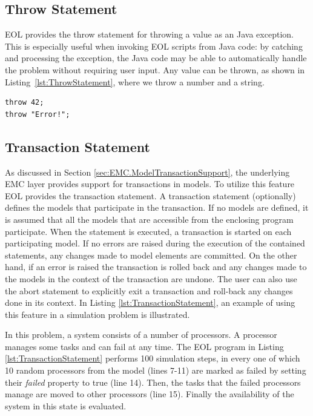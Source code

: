 \subsection{Throw Statement}
\label{sec:eol-throw}

EOL provides the throw statement for throwing a value as an  Java exception. This is especially useful when invoking EOL scripts from Java code: by catching and processing the exception, the Java code may be able to automatically handle the problem without requiring user input. Any value can be thrown, as shown in Listing~\ref{lst:ThrowStatement}, where we throw a number and a string.

\begin{lstlisting}[float=h, caption=Example of the throw statement, label=lst:ThrowStatement, language=EOL]
throw 42;
throw "Error!";
\end{lstlisting}

\subsection{Transaction Statement}

As discussed in Section \ref{sec:EMC.ModelTransactionSupport}, the underlying EMC layer provides support for transactions in models. To utilize this feature EOL provides the transaction statement. A transaction statement (optionally) defines the models that participate in the transaction. If no models are defined, it is assumed that all the models that are accessible from the enclosing program participate. When the statement is executed, a transaction is started on each participating model. If no errors are raised during the execution of the contained statements, any changes made to model elements are committed. On the other hand, if an error is raised the transaction is rolled back and any changes made to the models in the context of the transaction are undone. The user can also use the abort statement to explicitly exit a transaction and roll-back any changes done in its context. In Listing \ref{lst:TransactionStatement}, an example of using this feature in a simulation problem is illustrated.

In this problem, a system consists of a number of processors. A processor manages some tasks and can fail at any time. The EOL program in Listing \ref{lst:TransactionStatement} performs 100 simulation steps, in every one of which 10 random processors from the model (lines 7-11) are marked as failed by setting their \emph{failed} property to true (line 14). Then, the tasks that the failed processors manage are moved to other processors (line 15). Finally the availability of the system in this state is evaluated.

